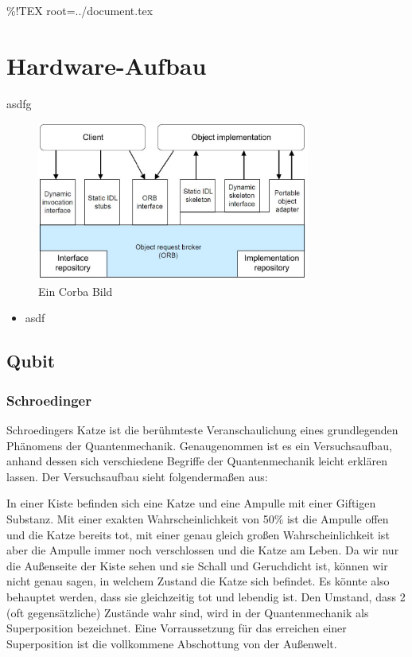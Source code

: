 \%!TEX root=../document.tex

\section{Hardware-Aufbau}
\label{sec:Hardware-Aufbau}

asdfg \cite{brands11}

\begin{figure}[!htb]
	\centering\includegraphics[width=0.8\textwidth]{images/corba.jpg}
	\caption{Ein Corba Bild}
	\label{corba}
\end{figure}

\begin{itemize}
    \item asdf
\end{itemize}


\subsection{Qubit}
\label{sec:Qubit}

\subsubsection{Schroedinger}

Schroedingers Katze ist die ber\"uhmteste Veranschaulichung eines grundlegenden Ph\"anomens der Quantenmechanik. Genaugenommen ist es ein Versuchsaufbau, anhand dessen sich verschiedene Begriffe der Quantenmechanik leicht erkl\"aren lassen. Der Versuchsaufbau sieht folgendermaßen aus:

In einer Kiste befinden sich eine Katze und eine Ampulle mit einer Giftigen Substanz. Mit einer exakten Wahrscheinlichkeit von 50\% ist die Ampulle offen und die Katze bereits tot, mit einer genau gleich großen Wahrscheinlichkeit ist aber die Ampulle immer noch verschlossen und die Katze am Leben. Da wir nur die Außenseite der Kiste sehen und sie Schall und Geruchdicht ist, k\"onnen wir nicht genau sagen, in welchem Zustand die Katze sich befindet. Es k\"onnte also behauptet werden, dass sie gleichzeitig tot und lebendig ist.
Den Umstand, dass 2 (oft gegens\"atzliche) Zust\"ande wahr sind, wird in der Quantenmechanik als Superposition bezeichnet. Eine Vorraussetzung f\"ur das erreichen einer Superposition ist die vollkommene Abschottung von der Außenwelt. 


